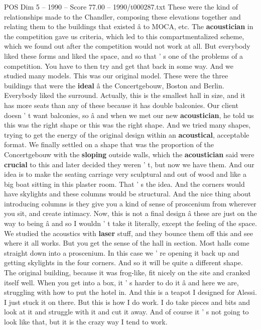 \begin{textsample}{POS Dim 5 – 1990 – Score 77.00 – 1990/t000287.txt}
These were the kind of relationships made to the Chandler, composing these elevations together and relating them to the buildings that existed â to MOCA, etc.
The \textbf{acoustician} in the competition gave us criteria, which led to this compartmentalized scheme, which we found out after the competition would not work at all.
But everybody liked these forms and liked the space, and so that ' s one of the problems of a competition.
You have to then try and get that back in some way.
And we studied many models.
This was our original model.
These were the three buildings that were the \textbf{ideal} â the Concertgebouw, Boston and Berlin.
Everybody liked the surround.
Actually, this is the smallest hall in size, and it has more seats than any of these because it has double balconies.
Our client doesn ' t want balconies, so â and when we met our new \textbf{acoustician}, he told us this was the right shape or this was the right shape.
And we tried many shapes, trying to get the energy of the original design within an \textbf{acoustical}, acceptable format.
We finally settled on a shape that was the proportion of the Concertgebouw with the \textbf{sloping} outside walls, which the \textbf{acoustician} said were \textbf{crucial} to this and later decided they weren ' t, but now we have them.
And our idea is to make the seating carriage very sculptural and out of wood and like a big boat sitting in this plaster room.
That ' s the idea.
And the corners would have skylights and these columns would be structural.
And the nice thing about introducing columns is they give you a kind of sense of proscenium from wherever you sit, and create intimacy.
Now, this is not a final design â these are just on the way to being â and so I wouldn ' t take it literally, except the feeling of the space.
We studied the acoustics with \textbf{laser} stuff, and they bounce them off this and see where it all works.
But you get the sense of the hall in section.
Most halls come straight down into a proscenium.
In this case we ' re opening it back up and getting skylights in the four corners.
And so it will be quite a different shape.
The original building, because it was frog-like, fit nicely on the site and cranked itself well.
When you get into a box, it ' s harder to do it â and here we are, struggling with how to put the hotel in.
And this is a teapot I designed for Alessi.
I just stuck it on there.
But this is how I do work.
I do take pieces and bits and look at it and struggle with it and cut it away.
And of course it ' s not going to look like that, but it is the crazy way I tend to work.

\end{textsample}
